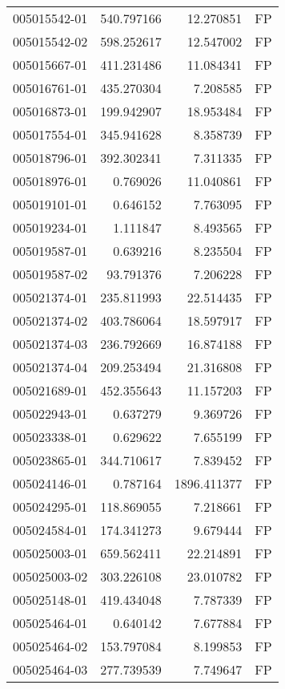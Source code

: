 \begin{tabular}{lrrl}
005015542-01 &  540.797166 &    12.270851 &   FP \\
005015542-02 &  598.252617 &    12.547002 &   FP \\
005015667-01 &  411.231486 &    11.084341 &   FP \\
005016761-01 &  435.270304 &     7.208585 &   FP \\
005016873-01 &  199.942907 &    18.953484 &   FP \\
005017554-01 &  345.941628 &     8.358739 &   FP \\
005018796-01 &  392.302341 &     7.311335 &   FP \\
005018976-01 &    0.769026 &    11.040861 &   FP \\
005019101-01 &    0.646152 &     7.763095 &   FP \\
005019234-01 &    1.111847 &     8.493565 &   FP \\
005019587-01 &    0.639216 &     8.235504 &   FP \\
005019587-02 &   93.791376 &     7.206228 &   FP \\
005021374-01 &  235.811993 &    22.514435 &   FP \\
005021374-02 &  403.786064 &    18.597917 &   FP \\
005021374-03 &  236.792669 &    16.874188 &   FP \\
005021374-04 &  209.253494 &    21.316808 &   FP \\
005021689-01 &  452.355643 &    11.157203 &   FP \\
005022943-01 &    0.637279 &     9.369726 &   FP \\
005023338-01 &    0.629622 &     7.655199 &   FP \\
005023865-01 &  344.710617 &     7.839452 &   FP \\
005024146-01 &    0.787164 &  1896.411377 &   FP \\
005024295-01 &  118.869055 &     7.218661 &   FP \\
005024584-01 &  174.341273 &     9.679444 &   FP \\
005025003-01 &  659.562411 &    22.214891 &   FP \\
005025003-02 &  303.226108 &    23.010782 &   FP \\
005025148-01 &  419.434048 &     7.787339 &   FP \\
005025464-01 &    0.640142 &     7.677884 &   FP \\
005025464-02 &  153.797084 &     8.199853 &   FP \\
005025464-03 &  277.739539 &     7.749647 &   FP \\

\end{tabular}
